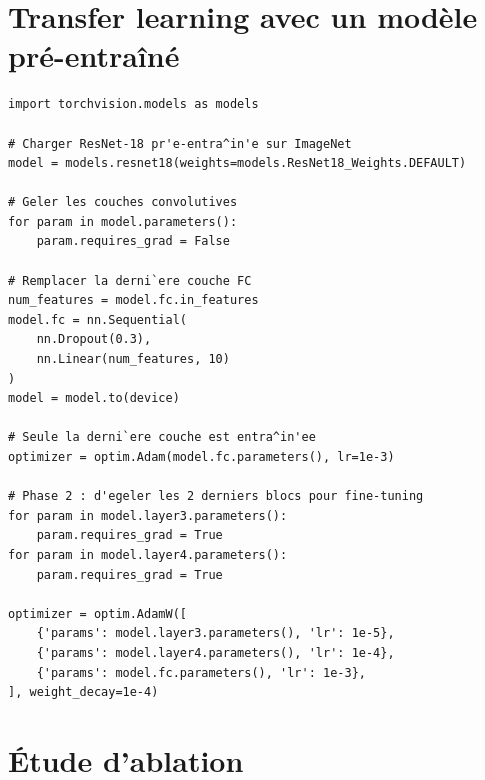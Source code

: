 \section{Transfer learning avec un mod\`ele pr\'e-entra\^in\'e}
\label{sec:transfer-code}

\begin{codeblock}[title=\textbf{Fine-tuning d'un ResNet-18 pr\'e-entra\^in\'e}]
\begin{verbatim}
import torchvision.models as models

# Charger ResNet-18 pr'e-entra^in'e sur ImageNet
model = models.resnet18(weights=models.ResNet18_Weights.DEFAULT)

# Geler les couches convolutives
for param in model.parameters():
    param.requires_grad = False

# Remplacer la derni`ere couche FC
num_features = model.fc.in_features
model.fc = nn.Sequential(
    nn.Dropout(0.3),
    nn.Linear(num_features, 10)
)
model = model.to(device)

# Seule la derni`ere couche est entra^in'ee
optimizer = optim.Adam(model.fc.parameters(), lr=1e-3)

# Phase 2 : d'egeler les 2 derniers blocs pour fine-tuning
for param in model.layer3.parameters():
    param.requires_grad = True
for param in model.layer4.parameters():
    param.requires_grad = True

optimizer = optim.AdamW([
    {'params': model.layer3.parameters(), 'lr': 1e-5},
    {'params': model.layer4.parameters(), 'lr': 1e-4},
    {'params': model.fc.parameters(), 'lr': 1e-3},
], weight_decay=1e-4)
\end{verbatim}
\end{codeblock}

\section{\'Etude d'ablation}
\label{sec:cnn-ablation}

